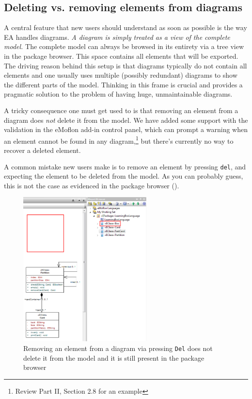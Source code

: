 \subsection{Deleting vs. removing elements from diagrams} 

A central feature that new users should understand as soon as possible is the way EA handles diagrams. \emph{A diagram is simply treated as a \emph{view} of the
complete model.} The complete model can always be browsed in its entirety via a tree view in the package browser. This space contains all elements that will be
exported. The driving reason behind this setup is that diagrams typically do not contain all elements and one usually uses multiple (possibly redundant)
diagrams to show the different parts of the model. Thinking in this frame is crucial and provides a pragmatic solution to the problem of having huge,
unmaintainable diagrams.

A tricky consequence one must get used to is that removing an element from a diagram does \emph{not} delete it from the model. We have added some support
with the validation in the eMoflon add-in control panel, which can prompt a warning when an element cannot be found in any diagram,\footnote{Review Part II,
Section 2.8 for an example} but there's currently no way to recover a deleted element.

A common mistake new users make is to remove an element by pressing \texttt{del}, and expecting the element to be deleted from the model. As you can probably
guess, this is not the case as evidenced in the package browser ().

\vspace{0.5cm}

\begin{figure}[htbp]
\begin{center} 
\includegraphics[width=0.6\textwidth]{../../org.moflon.doc.handbook.05_miscellaneous/1_grokkingEA/03_delVSRem/ea_partiallyDeleted}
  \caption{Removing an element from a diagram via pressing \texttt{Del} does not delete it from the model and it is still present in the package browser}  
    \label{ea:partiallyDeleted}
\end{center}
\end{figure}  

